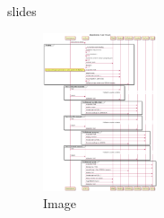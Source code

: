 \begin{frame}{slides}

\begin{figure}[htb]
	\centering
	\includegraphics[width=0.3\textwidth]{../img/release.png}
	\caption{Image}
	\label{fig:onepoint}
\end{figure}

\end{frame}